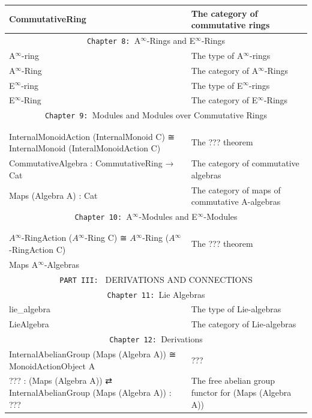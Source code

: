 \documentclass{book}
\theoremstyle{definition}
\begin{document}
{\begin{longtable}{|| l || l ||}
\hline
CommutativeRing & The category of commutative rings \\
 \hline \hline
  \multicolumn{2}{||c||}{\texttt{Chapter 8: }A${}^{\infty}$-Rings and E${}^{\infty}$-Rings} \\
\hline \hline
A${}^{\infty}$-ring & The type of A${}^{\infty}$-rings \\
\hline
A${}^{\infty}$-Ring & The category of A${}^{\infty}$-Rings \\
 \hline
E${}^{\infty}$-ring  & The type of E${}^{\infty}$-rings \\
 \hline
E${}^{\infty}$-Ring  & The category of E${}^{\infty}$-Rings \\
 \hline \hline
\multicolumn{2}{||c||}{\texttt{Chapter 9: }Modules and Modules over Commutative Rings} \\
\hline \hline
 &  \\
 \hline
 &  \\
 \hline
InternalMonoidAction (InternalMonoid C) ≅ InternalMonoid (InteralMonoidAction C) & The ??? theorem \\ 
\hline
CommutativeAlgebra : CommutativeRing → Cat & The category of commutative algebras \\
\hline
Maps (Algebra A) : Cat & The category of maps of commutative A-algebras \\
\hline \hline
\multicolumn{2}{||c||}{\texttt{Chapter 10: }A${}^{\infty}$-Modules and E${}^{\infty}$-Modules} \\
\hline \hline
 &  \\
\hline
 &  \\
\hline
$A{}^{\infty}$-RingAction ($A{}^{\infty}$-Ring C) ≅ $A{}^{\infty}$-Ring ($A{}^{\infty}$-RingAction C) & The ??? theorem \\ 
\hline
Maps A${}^{\infty}$-Algebras & \\
 \hline \hline
\multicolumn{2}{||c||}{\texttt{PART III: } DERIVATIONS AND CONNECTIONS} \\
\hline \hline
\multicolumn{2}{||c||}{\texttt{Chapter 11: }Lie Algebras} \\
\hline \hline
lie\_algebra & The type of Lie-algebras \\
\hline
LieAlgebra & The category of Lie-algebras \\
\hline \hline
\multicolumn{2}{||c||}{\texttt{Chapter 12: }Derivations} \\
\hline \hline
InternalAbelianGroup (Maps (Algebra A)) ≅ MonoidActionObject A & ??? \\
\hline
??? : (Maps (Algebra A)) ⇄ InternalAbelianGroup (Maps (Algebra A)) : ??? & The free abelian group functor for (Maps (Algebra A)) \\

\end{longtable}}
\end{document}
